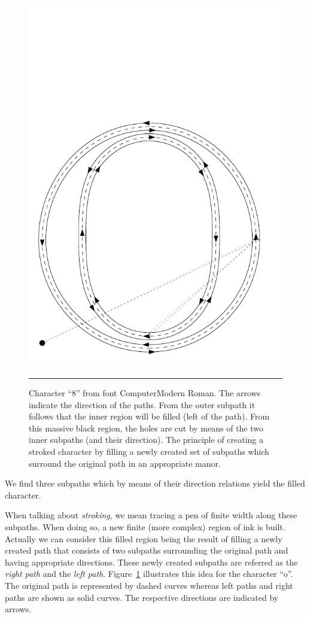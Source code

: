 \begin{figure}[t]
\includegraphics[scale=0.5]{t1dump/t1dump_o}
\hfill\break
\hrule\vskip3mm\small
\caption{\label{figure:stroking1} Character ``8'' from font
  ComputerModern Roman. The arrows indicate the direction of the paths. From
  the outer subpath it follows that the inner region will be filled (left of the
  path). From this massive black region, the holes are cut by means of the two
  inner subpaths (and their direction).  The principle of creating a
  stroked character by filling a newly created set of subpaths which surround
  the original path in an appropriate manor.}
\end{figure}
We find three subpaths which by means of their direction relations yield the
filled character. 

When talking about {\em stroking}, we mean tracing a pen of finite width along
these subpaths. When doing so, a new finite (more complex) region of ink is
built. Actually we can consider this filled region being the result of filling
a newly created path that consists of two subpaths surrounding the original
path and having appropriate directions. These newly created subpaths are
referred as the {\em right path} and the {\em left path}.
Figure~\ref{figure:stroking1}  illustrates this idea for the
character ``o''. The original path is represented by dashed curves whereas
left paths and right paths are shown as solid curves. The respective
directions are indicated by arrows.

